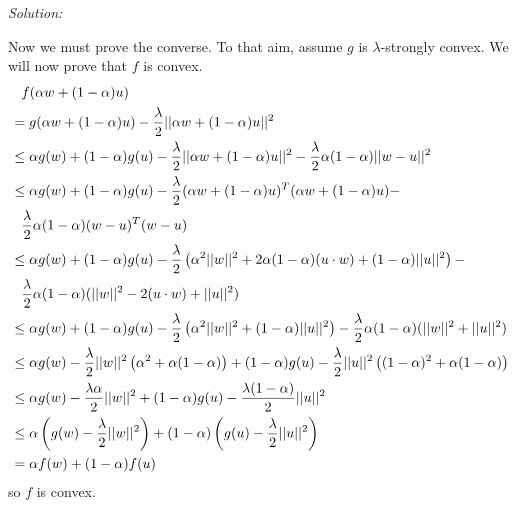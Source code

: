 \documentclass[
10pt, %
a4paper, %
oneside, %
headinclude,footinclude, %
BCOR5mm, %
]{scrartcl}
\newenvironment{solution}
               {\textit{Solution:}}
               {}
\begin{document}
\begin{solution}
\begin{enumerate}[label=(\alph*)]
        Now we must prove the converse. To that aim, assume $g$ is $\lambda$-strongly convex. We will now prove that $f$ is convex.
        \begin{align*}
          &\hphantom{=} f(\alpha w + (1-\alpha)u) \\
          &= g(\alpha w + (1-\alpha)u) - \frac{\lambda}{2}||\alpha w + (1-\alpha)u||^2 \\
          &\leq \alpha g(w) + (1-\alpha)g(u) - \frac{\lambda}{2}||\alpha w + (1-\alpha) u||^2 - \frac{\lambda}{2}\alpha(1-\alpha)||w-u||^2 \\
          &\leq \alpha g(w) + (1-\alpha)g(u) - \frac{\lambda}{2}(\alpha w + (1-\alpha) u)^T(\alpha w + (1-\alpha) u) - \\
          &\hphantom{\leq} \frac{\lambda}{2}\alpha(1-\alpha)(w-u)^T(w-u) \\
          &\leq \alpha g(w) + (1-\alpha)g(u) - \frac{\lambda}{2}\left(\alpha^2 ||w||^2 + 2\alpha(1-\alpha)(u \cdot w) + (1-\alpha) ||u||^2\right) - \\
          &\hphantom{\leq} \frac{\lambda}{2}\alpha(1-\alpha)(||w||^2 - 2(u\cdot w) + ||u||^2) \\
          &\leq \alpha g(w) + (1-\alpha)g(u) - \frac{\lambda}{2}\left(\alpha^2 ||w||^2 + (1-\alpha) ||u||^2\right) - \frac{\lambda}{2}\alpha(1-\alpha)(||w||^2 + ||u||^2) \\
          &\leq \alpha g(w) - \frac{\lambda}{2}||w||^2\left(\alpha^2 + \alpha(1-\alpha) \right)  + (1-\alpha)g(u) - \frac{\lambda}{2}||u||^2\left((1-\alpha)^2 + \alpha(1-\alpha)\right) \\
          &\leq \alpha g(w) - \frac{\lambda\alpha}{2}||w||^2  + (1-\alpha)g(u) - \frac{\lambda(1-\alpha)}{2}||u||^2 \\
          &\leq \alpha \left(g(w) - \frac{\lambda}{2}||w||^2\right) + (1-\alpha)\left(g(u) - \frac{\lambda}{2}||u||^2\right) \\
          &= \alpha f(w) + (1-\alpha)f(u)
        \end{align*}
        so $f$ is convex.
  \end{enumerate}
\end{solution}
\end{document}
